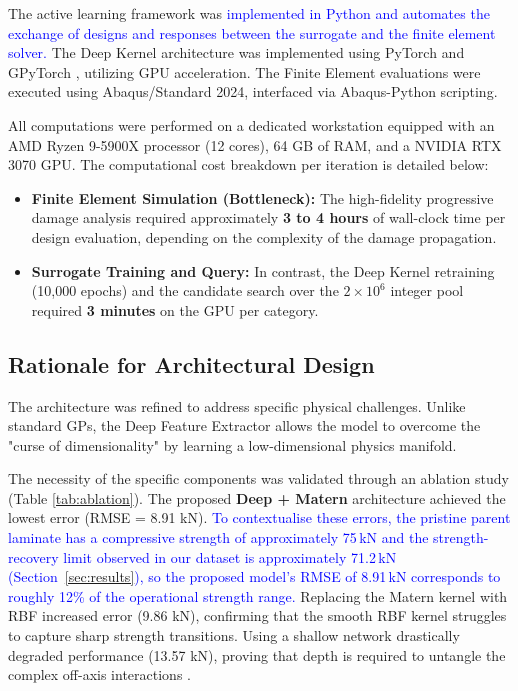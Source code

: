 \documentclass[
  preprint,
  12pt,
  a4paper
]{elsarticle}
\newcommand{\new}[1]{\textcolor{blue}{#1}}
\begin{document}
The active learning framework was \new{implemented in Python and automates the exchange of designs and responses between the surrogate and the finite element solver.} The Deep Kernel architecture was implemented using PyTorch \cite{paszke2019pytorch} and GPyTorch \cite{gardner2018gpytorch}, utilizing GPU acceleration. The Finite Element evaluations were executed using Abaqus/Standard 2024, interfaced via Abaqus-Python scripting.

All computations were performed on a dedicated workstation equipped with an AMD Ryzen 9-5900X processor (12 cores), 64 GB of RAM, and a NVIDIA RTX 3070 GPU. The computational cost breakdown per iteration is detailed below:

\begin{itemize}
    \item \textbf{Finite Element Simulation (Bottleneck):} The high-fidelity progressive damage analysis required approximately \textbf{3 to 4 hours} of wall-clock time per design evaluation, depending on the complexity of the damage propagation.
    \item \textbf{Surrogate Training and Query:} In contrast, the Deep Kernel retraining (10,000 epochs) and the candidate search over the $2 \times 10^6$ integer pool required \textbf{3 minutes} on the GPU per category.
\end{itemize}


\subsection{Rationale for Architectural Design}
\label{sec:ai_rationale}

The architecture was refined to address specific physical challenges. Unlike standard GPs, the Deep Feature Extractor allows the model to overcome the "curse of dimensionality" by learning a low-dimensional physics manifold. 

The necessity of the specific components was validated through an ablation study (Table \ref{tab:ablation}). The proposed \textbf{Deep + Matern} architecture achieved the lowest error (RMSE = 8.91 kN). \new{To contextualise these errors, the pristine parent laminate has a compressive strength of approximately 75\,kN and the strength-recovery limit observed in our dataset is approximately 71.2\,kN (Section~\ref{sec:results}), so the proposed model's RMSE of 8.91\,kN corresponds to roughly 12\% of the operational strength range.} Replacing the Matern kernel with RBF increased error (9.86 kN), confirming that the smooth RBF kernel struggles to capture sharp strength transitions. Using a shallow network drastically degraded performance (13.57 kN), proving that depth is required to untangle the complex off-axis interactions \cite{montufar2014number}.
\end{document}
